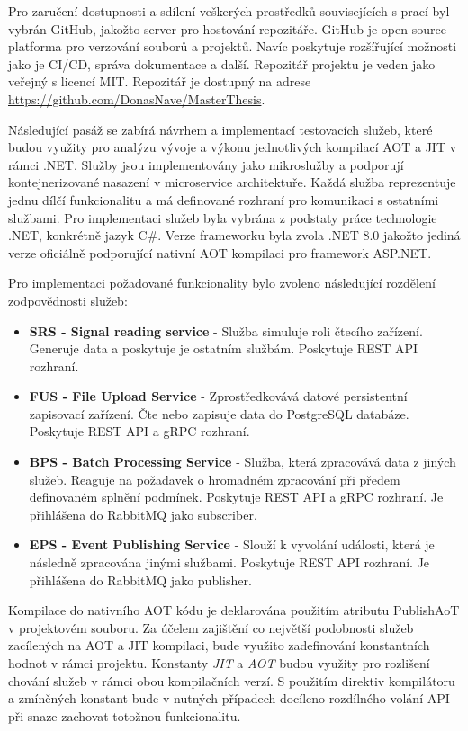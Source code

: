Pro zaručení dostupnosti a sdílení veškerých prostředků souvisejících s prací byl vybrán GitHub, jakožto server pro hostování repozitáře. GitHub je open-source platforma pro verzování souborů a projektů. Navíc poskytuje rozšířující možnosti jako je CI/CD, správa dokumentace a další. Repozitář projektu je veden jako veřejný s licencí MIT. Repozitář je dostupný na adrese \url{https://github.com/DonasNave/MasterThesis}.


Následující pasáž se zabírá návrhem a implementací testovacích služeb, které budou využity pro analýzu vývoje a výkonu jednotlivých kompilací AOT a JIT v rámci .NET. Služby jsou implementovány jako mikroslužby a podporují kontejnerizované nasazení v microservice architektuře. Každá služba reprezentuje jednu dílčí funkcionalitu a má definované rozhraní pro komunikaci s ostatními službami. Pro implementaci služeb byla vybrána z podstaty práce technologie .NET, konkrétně jazyk C\#. Verze frameworku byla zvola .NET 8.0 jakožto jediná verze oficiálně podporující nativní AOT kompilaci pro framework ASP.NET.


Pro implementaci požadované funkcionality bylo zvoleno následující rozdělení zodpovědnosti služeb:

\begin{itemize}
    \item \textbf{SRS - Signal reading service} - Služba simuluje roli čtecího zařízení. Generuje data a poskytuje je ostatním službám. Poskytuje REST API rozhraní.
    \item \textbf{FUS - File Upload Service} - Zprostředkovává datové persistentní zapisovací zařízení. Čte nebo zapisuje data do PostgreSQL databáze. Poskytuje REST API a gRPC rozhraní.
    \item \textbf{BPS - Batch Processing Service} - Služba, která zpracovává data z jiných služeb. Reaguje na požadavek o hromadném zpracování při předem definovaném splnění podmínek. Poskytuje REST API a gRPC rozhraní. Je přihlášena do RabbitMQ jako subscriber.
    \item \textbf{EPS - Event Publishing Service} - Slouží k vyvolání události, která je následně zpracována jinými službami. Poskytuje REST API rozhraní. Je přihlášena do RabbitMQ jako publisher.
\end{itemize}

Kompilace do nativního AOT kódu je deklarována použitím atributu PublishAoT v projektovém souboru. Za účelem zajištění co největší podobnosti služeb zacílených na AOT a JIT kompilaci, bude využito zadefinování konstantních hodnot v rámci projektu. Konstanty \emph{JIT} a \emph{AOT} budou využity pro rozlišení chování služeb v rámci obou kompilačních verzí. S použitím direktiv kompilátoru a zmíněných konstant bude v nutných případech docíleno rozdílného volání API při snaze zachovat totožnou funkcionalitu.

